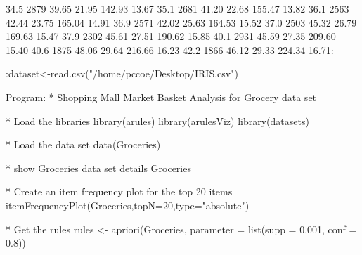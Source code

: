 \documentclass[a4paper,12pt]{article}
\begin{document}
{{   34.5 2879   39.65   21.95 142.93    13.67
   35.1 2681   41.20   22.68 155.47    13.82
   36.1 2563   42.44   23.75 165.04    14.91
   36.9 2571   42.02   25.63 164.53    15.52
   37.0 2503   45.32   26.79 169.63    15.47
   37.9 2302   45.61   27.51 190.62    15.85
   40.1 2931   45.59   27.35 209.60    15.40
   40.6 1875   48.06   29.64 216.66    16.23
   42.2 1866   46.12   29.33 224.34    16.71: 
\newline

:dataset<-read.csv("/home/pccoe/Desktop/IRIS.csv")
\newline




Program:
\newline
* Shopping Mall Market Basket Analysis for Grocery data set 
\newline

* Load the libraries
\newline
library(arules)
\newline
library(arulesViz)
\newline
library(datasets)
\newline

* Load the data set
\newline
data(Groceries)
\newline

* show Groceries data set details
\newline
Groceries
\newline

* Create an item frequency plot for the top 20 items
\newline
itemFrequencyPlot(Groceries,topN=20,type="absolute")
\newline

* Get the rules
\newline
rules <- apriori(Groceries, parameter = list(supp = 0.001, conf = 0.8))
\newline

}}
\end{document}
